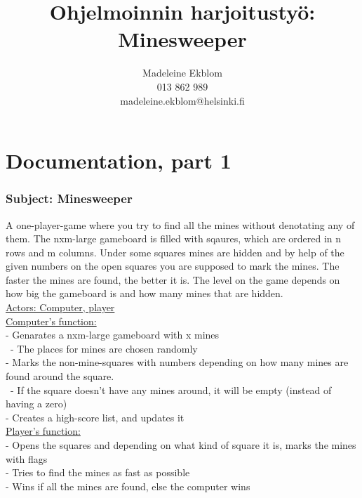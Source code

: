 \documentclass[12pt,twoside,a4paper]{article}
\title{Ohjelmoinnin harjoitustyö: Minesweeper}
\author{Madeleine Ekblom
 \\ 013 862 989
\\ madeleine.ekblom@helsinki.fi}
\begin{document}
\maketitle
\section{Documentation, part 1}

\subsubsection*{Subject: Minesweeper}
A one-player-game where you try to find all the mines without denotating any of them. The nxm-large gameboard 
is filled with sqaures, which are ordered in n rows and m columns. Under some squares mines are hidden and by 
help of the given numbers on the open squares you are supposed to mark the mines. The faster the mines are found, 
the better it is. The level on the game depends on how big the gameboard is and how many mines that are hidden.  \\

\underline{Actors: Computer, player} \\ 

\underline{Computer's function:} \\
	- Genarates a nxm-large gameboard with x mines \\
	\ 	- The places for mines are chosen randomly \\
	- Marks the non-mine-squares with numbers depending on how many mines are found around the square. \\
	  \ - If the square doesn't have any mines around, it will be empty (instead of having a zero) \\
	- Creates a high-score list, and updates it  \\

\underline{Player's function:} \\
	- Opens the squares and depending on what kind of square it is, marks the mines with flags \\
	- Tries to find the mines as fast as possible \\ 
	- Wins if all the mines are found, else the computer wins \\
\end{document}
